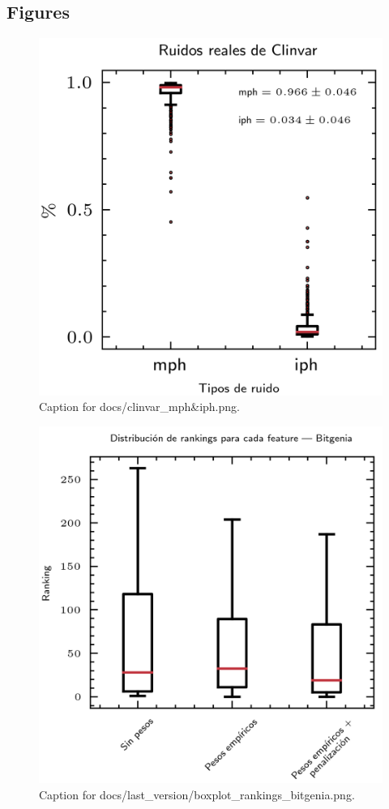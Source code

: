 \documentclass{article}
\begin{document}
\subsection{Figures}
\begin{figure}[h] \centering \includegraphics{docs/clinvar_mph&iph.png} \caption{Caption for docs/clinvar_mph&iph.png.} \end{figure}
\begin{figure}[h] \centering \includegraphics{docs/last_version/boxplot_rankings_bitgenia.png} \caption{Caption for docs/last_version/boxplot_rankings_bitgenia.png.} \end{figure}
\end{document}
